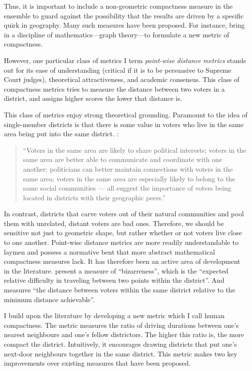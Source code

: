 \documentclass[]{article}
\begin{document}
Thus, it is important to include a non-geometric compactness measure in
the ensemble to guard against the possibility that the results are
driven by a specific quirk in geography. Many such measures have been
proposed. For instance, \cite{dc2016} bring in a discipline of
mathematics---graph theory---to formulate a new metric of compactness.

However, one particular class of metrics I term \emph{point-wise
distance metrics} stands out for its ease of understanding (critical if
it is to be persuasive to Supreme Court judges), theoretical
attractiveness, and academic consensus. This class of compactness
metrics tries to measure the distance between two voters in a district,
and assigns higher scores the lower that distance is.

This class of metrics enjoy strong theoretical grounding. Paramount to
the idea of single-member districts is that there is some value in
voters who live in the same area being put into the same district.
\cite{er2019}:

\begin{quote}
``Voters in the same area are likely to share political interests;
voters in the same area are better able to communicate and coordinate
with one another; politicians can better maintain connections with
voters in the same area; voters in the same area are especially likely
to belong to the same social communities --- all suggest the importance
of voters being located in districts with their geographic peers.''
\end{quote}

In contrast, districts that carve voters out of their natural
communities and pool them with unrelated, distant voters are bad ones.
Therefore, we should be sensitive not just to geometric shape, but
rather whether or not voters live close to one another. Point-wise
distance metrics are more readily understandable to laymen and possess a
normative bent that more abstract mathematical compactness measures
lack. It has therefore been an active area of development in the
literature. \cite{cm2010} present a measure of ``bizarreness'', which is
the ``expected relative difficulty in traveling between two points
within the district''. And \cite{fh2011} measures ``the distance between
voters within the same district relative to the minimum distance
achievable''.

I build upon the literature by developing a new metric which I call
human compactness. The metric measures the ratio of driving durations
between one's nearest neighbours and one's fellow districtors. The
higher this ratio is, the more compact the district. Intuitively, it
encourages drawing districts that put one's next-door neighbours
together in the same district. This metric makes two key improvements
over existing measures that have been proposed.
\end{document}

